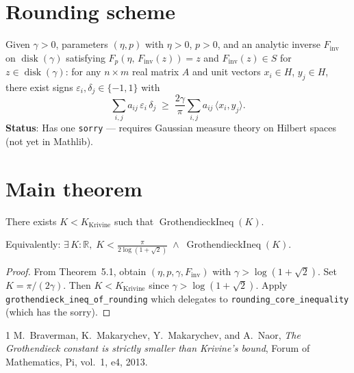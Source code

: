 \chapter{Rounding scheme}

\begin{theorem}
  \label{thm:rounding}
  Given $\gamma > 0$, parameters $(\eta, p)$ with $\eta > 0$, $p > 0$,
  and an analytic inverse $F_{\mathrm{inv}}$ on $\operatorname{disk}(\gamma)$ satisfying
  $F_p(\eta,\, F_{\mathrm{inv}}(z)) = z$ and $F_{\mathrm{inv}}(z) \in S$ for $z \in \operatorname{disk}(\gamma)$:
  for any $n \times m$ real matrix $A$ and unit vectors
  $x_i \in H$, $y_j \in H$, there exist signs $\varepsilon_i, \delta_j \in \{-1, 1\}$ with
  \[
    \sum_{i,j} a_{ij}\, \varepsilon_i\, \delta_j
    \;\geq\;
    \frac{2\gamma}{\pi} \sum_{i,j} a_{ij}\, \langle x_i, y_j \rangle.
  \]
  \textbf{Status}: Has one \texttt{sorry} --- requires Gaussian measure theory on
  Hilbert spaces (not yet in Mathlib).
\end{theorem}

\chapter{Main theorem}

\begin{theorem}
  \label{thm:1_1}
  There exists $K < K_{\text{Krivine}}$ such that $\operatorname{GrothendieckIneq}(K)$.

  Equivalently: $\exists\, K : \mathbb{R},\; K < \frac{\pi}{2\log(1+\sqrt{2})} \;\wedge\; \operatorname{GrothendieckIneq}(K)$.
\end{theorem}

\begin{proof}
  From Theorem~5.1, obtain $(\eta, p, \gamma, F_{\mathrm{inv}})$ with
  $\gamma > \log(1+\sqrt{2})$. Set $K = \pi/(2\gamma)$.
  Then $K < K_{\text{Krivine}}$ since $\gamma > \log(1+\sqrt{2})$.
  Apply \texttt{grothendieck\_ineq\_of\_rounding} which delegates to
  \texttt{rounding\_core\_inequality} (which has the sorry).
\end{proof}

\begin{thebibliography}{1}
M.~Braverman, K.~Makarychev, Y.~Makarychev, and A.~Naor,
\emph{The Grothendieck constant is strictly smaller than Krivine's bound},
Forum of Mathematics, Pi, vol.~1, e4, 2013.
\end{thebibliography}
